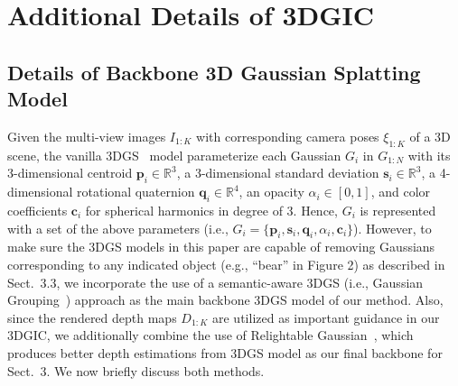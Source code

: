\clearpage
\setcounter{page}{1}
\maketitlesupplementary
\appendix

\section{Additional Details of 3DGIC}
\label{sec:details}


\subsection{Details of Backbone 3D Gaussian Splatting Model}
\label{subsec:backbone}
Given the multi-view images $I_{1:K}$ with corresponding camera poses $\xi_{1:K}$ of a 3D scene, the vanilla 3DGS~\cite{kerbl202333dgs} model parameterize each Gaussian $G_i$ in $G_{1:N}$ with its 3-dimensional centroid $\mathbf{p}_i \in \mathbb{R}^{3}$, a 3-dimensional standard deviation $\mathbf{s}_i \in \mathbb{R}^{3}$, a 4-dimensional rotational quaternion $\mathbf{q}_i \in \mathbb{R}^{4}$, an opacity ${\alpha}_i \in [0,1]$, and color coefficients $\mathbf{c}_i$ for spherical harmonics in degree of 3. Hence, $G_i$ is represented with a set of the above parameters (i.e., $G_i = \{\mathbf{p}_i, \mathbf{s}_i, \mathbf{q}_i, {\alpha}_i, \mathbf{c}_i\}$). However, to make sure the 3DGS models in this paper are capable of removing Gaussians corresponding to any indicated object (e.g., ``bear'' in Figure \textcolor{cvprblue}{2}) as described in Sect.~\textcolor{cvprblue}{3.3}, we incorporate the use of a semantic-aware 3DGS (i.e., Gaussian Grouping~\cite{ye2023gaussiangrouping}) approach as the main backbone 3DGS model of our method. Also, since the rendered depth maps $D_{1:K}$ are utilized as important guidance in our 3DGIC, we additionally combine the use of Relightable Gaussian~\cite{gao2023relightable}, which produces better depth estimations from 3DGS model as our final backbone for Sect.~\textcolor{cvprblue}{3}. We now briefly discuss both methods.  

